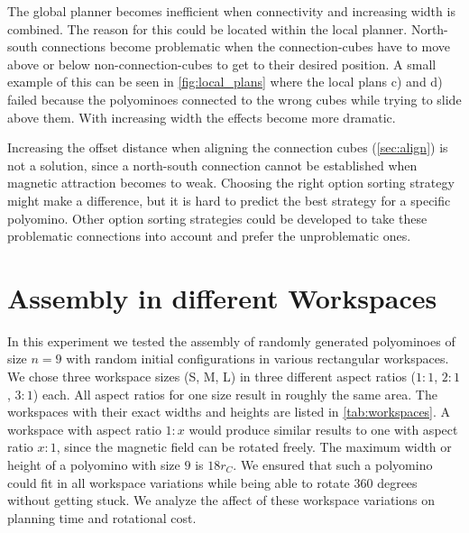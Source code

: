 The global planner becomes inefficient when connectivity and increasing width is combined.
The reason for this could be located within the local planner.
North-south connections become problematic when the connection-cubes have to move above or below non-connection-cubes to get to their desired position.
A small example of this can be seen in \autoref{fig:local_plans} where the local plans c) and d) failed because the polyominoes connected to the wrong cubes while trying to slide above them.
With increasing width the effects become more dramatic.

Increasing the offset distance when aligning the connection cubes (\autoref{sec:align}) is not a solution, since a north-south connection cannot be established when magnetic attraction becomes to weak.
Choosing the right option sorting strategy might make a difference, but it is hard to predict the best strategy for a specific polyomino.
Other option sorting strategies could be developed to take these problematic connections into account and prefer the unproblematic ones.



\section{Assembly in different Workspaces}
\label{sec:AFBS}

In this experiment we tested the assembly of randomly generated polyominoes of size $n=9$ with random initial configurations in various rectangular workspaces.
We chose three workspace sizes (S, M, L) in three different aspect ratios ($ 1:1 $, $ 2:1 $, $ 3:1 $) each.
All aspect ratios for one size result in roughly the same area. The workspaces with their exact widths and heights are listed in \autoref{tab:workspaces}.
A workspace with aspect ratio $ 1:x $ would produce similar results to one with aspect ratio $ x:1 $, since the magnetic field can be rotated freely.
The maximum width or height of a polyomino with size $9$ is $18 r_C$.
We ensured that such a polyomino could fit in all workspace variations while being able to rotate $360$ degrees without getting stuck.
We analyze the affect of these workspace variations on planning time and rotational cost.

